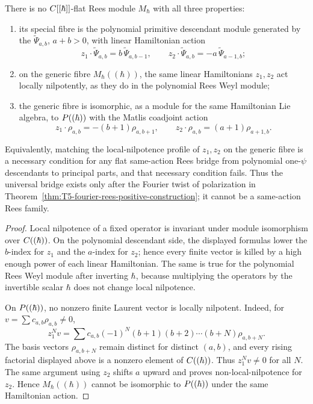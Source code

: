 \begin{thm}
  \label{thm:no-same-action-rees-fourier-descendants}
  There is no \(C[[\hbar]]\)-flat Rees module \(M_\hbar\) with all three
  properties:
  \begin{enumerate}
    \item its special fibre is the polynomial primitive descendant module
      generated by the \(\widetilde\Psi_{a,b}\), \(a+b>0\), with linear
      Hamiltonian action
      \[
        z_1\cdot\widetilde\Psi_{a,b}=b\,\widetilde\Psi_{a,b-1},
        \qquad
        z_2\cdot\widetilde\Psi_{a,b}=-a\,\widetilde\Psi_{a-1,b};
      \]
    \item on the generic fibre \(M_\hbar((\hbar))\), the same linear
      Hamiltonians \(z_1,z_2\) act locally nilpotently, as they do in the
      polynomial Rees Weyl module;
    \item the generic fibre is isomorphic, as a module for the same
      Hamiltonian Lie algebra, to
      \(P((\hbar))\) with the Matlis coadjoint action
      \[
        z_1\cdot\rho_{a,b}=-(b+1)\rho_{a,b+1},\qquad
        z_2\cdot\rho_{a,b}=(a+1)\rho_{a+1,b}.
      \]
  \end{enumerate}
  Equivalently, matching the local-nilpotence profile of \(z_1,z_2\) on
  the generic fibre is a necessary condition for any flat same-action
  Rees bridge from polynomial one-\(\psi\) descendants to principal parts,
  and that necessary condition fails.  Thus the universal bridge exists
  only after the Fourier twist of polarization in
  Theorem~\ref{thm:T5-fourier-rees-positive-construction}; it cannot be a
  same-action Rees family.
\end{thm}

\begin{proof}
  Local nilpotence of a fixed operator is invariant under module
  isomorphism over \(C((\hbar))\).  On the polynomial descendant side,
  the displayed formulas lower the \(b\)-index for \(z_1\) and the
  \(a\)-index for \(z_2\); hence every finite vector is killed by a high
  enough power of each linear Hamiltonian.  The same is true for the
  polynomial Rees Weyl module after inverting \(\hbar\), because
  multiplying the operators by the invertible scalar \(\hbar\) does not
  change local nilpotence.

  On \(P((\hbar))\), no nonzero finite Laurent vector is locally
  nilpotent.  Indeed, for
  \(v=\sum c_{a,b}\rho_{a,b}\neq0\),
  \[
    z_1^N v
      =
      \sum c_{a,b}(-1)^N(b+1)(b+2)\cdots(b+N)\rho_{a,b+N}.
  \]
  The basis vectors \(\rho_{a,b+N}\) remain distinct for distinct
  \((a,b)\), and every rising factorial displayed above is a nonzero
  element of \(C((\hbar))\).  Thus \(z_1^Nv\neq0\) for all \(N\).  The
  same argument using \(z_2\) shifts \(a\) upward and proves
  non-local-nilpotence for \(z_2\).  Hence
  \(M_\hbar((\hbar))\) cannot be isomorphic to \(P((\hbar))\) under
  the same Hamiltonian action.
\end{proof}

